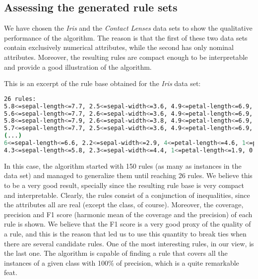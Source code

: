 \documentclass[a4paper]{article}
\begin{document}
\subsection{Assessing the generated rule sets}

We have chosen the \emph{Iris} and the \emph{Contact Lenses} data sets to show the qualitative performance of the algorithm. The reason is that the first of these two data sets contain exclusively numerical attributes, while the second has only nominal attributes. Moreover, the resulting rules are compact enough to be interpretable and provide a good illustration of the algorithm.

This is an excerpt of the rule base obtained for the \emph{Iris} data set:
\begin{lstlisting}[language=bash,frame=single,breaklines=true]
26 rules:
5.8<=sepal-length<=7.7, 2.5<=sepal-width<=3.6, 4.9<=petal-length<=6.9, 1.8<=petal-width<=2.5 -> Iris-virginica (coverage: 78%, precision: 100%, f1: 0.876404)
5.6<=sepal-length<=7.7, 2.6<=sepal-width<=3.6, 4.9<=petal-length<=6.9, 1.8<=petal-width<=2.5 -> Iris-virginica (coverage: 76%, precision: 100%, f1: 0.863636)
5.8<=sepal-length<=7.9, 2.6<=sepal-width<=3.8, 4.9<=petal-length<=6.9, 1.8<=petal-width<=2.5 -> Iris-virginica (coverage: 78%, precision: 100%, f1: 0.876404)
5.7<=sepal-length<=7.7, 2.5<=sepal-width<=3.6, 4.9<=petal-length<=6.9, 1.8<=petal-width<=2.5 -> Iris-virginica (coverage: 80%, precision: 100%, f1: 0.888889)
(...)
6<=sepal-length<=6.6, 2.2<=sepal-width<=2.9, 4<=petal-length<=4.6, 1<=petal-width<=1.3 -> Iris-versicolor (coverage: 12%, precision: 100%, f1: 0.214286)
4.3<=sepal-length<=5.8, 2.3<=sepal-width<=4.4, 1<=petal-length<=1.9, 0.1<=petal-width<=0.6 -> Iris-setosa (coverage: 100%, precision: 100%, f1: 1)
\end{lstlisting}

In this case, the algorithm started with 150 rules (as many as instances in the data set) and managed to generalize them until reaching 26 rules. We believe this to be a very good result, specially since the resulting rule base is very compact and interpretable. Clearly, the rules consist of a conjunction of inequalities, since the attributes all are real (except the class, of course). Moreover, the coverage, precision and F1 score (harmonic mean of the coverage and the precision) of each rule is shown. We believe that the F1 score is a very good proxy of the quality of a rule, and this is the reason that led us to use this quantity to break ties when there are several candidate rules. One of the most interesting rules, in our view, is the last one. The algorithm is capable of finding a rule that covers all the instances of a given class with 100\% of precision, which is a quite remarkable feat.
\end{document}

